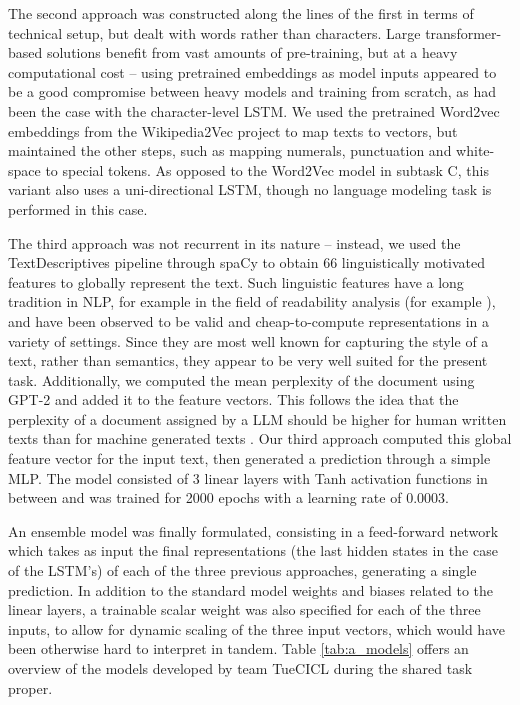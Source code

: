 The second approach was constructed along the lines of the first in terms of technical setup, but dealt with words rather than characters.
Large transformer-based solutions benefit from vast amounts of pre-training, but at a heavy computational cost -- using pretrained embeddings as model inputs appeared to be a good compromise between heavy models and training from scratch, as had been the case with the character-level LSTM.
We used the pretrained Word2vec embeddings from the Wikipedia2Vec \citep{yamada2020wikipedia2vec} project to map texts to vectors, but maintained the other steps, such as mapping numerals, punctuation and white-space to special tokens.
As opposed to the Word2Vec model in subtask C, this variant also uses a uni-directional LSTM, though no language modeling task is performed in this case.

The third approach was not recurrent in its nature -- instead, we used the TextDescriptives pipeline \citep{Hansen_2023} through spaCy \citep{honnibal2020spacy} to obtain 66 linguistically motivated features to globally represent the text.
Such linguistic features have a long tradition in NLP, for example in the field of readability analysis (for example \citealp{vajjala-meurers-2012-improving}), and have been observed to be valid and cheap-to-compute representations in a variety of settings.
Since they are most well known for capturing the style of a text, rather than semantics, they appear to be very well suited for the present task.
Additionally, we computed the mean perplexity of the document using GPT-2 \citep{Radford2019} and added it to the feature vectors.
This follows the idea that the perplexity of a document assigned by a LLM should be higher for human written texts than for machine generated texts \citep{chaka2023detecting}.
Our third approach computed this global feature vector for the input text, then generated a prediction through a simple MLP.
The model consisted of 3 linear layers with Tanh activation functions in between and was trained for 2000 epochs with a learning rate of 0.0003.

An ensemble model was finally formulated, consisting in a feed-forward network which takes as input the final representations (the last hidden states in the case of the LSTM's) of each of the three previous approaches, generating a single prediction.
In addition to the standard model weights and biases related to the linear layers, a trainable scalar weight was also specified for each of the three inputs, to allow for dynamic scaling of the three input vectors, which would have been otherwise hard to interpret in tandem.
Table \ref{tab:a_models} offers an overview of the models developed by team TueCICL during the shared task proper.

